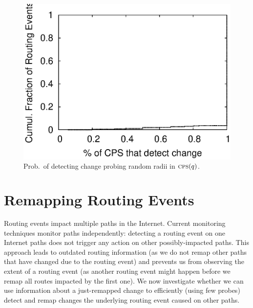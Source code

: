 \begin{figure}
\begin{minipage}{0.32\textwidth}
\label{fig:overlap.quantity.cdf}
\end{minipage}
%
\hfill
\begin{minipage}{0.32\textwidth}
\includegraphics[width=1.05\columnwidth]{figs/patching/overlapcoverage/overlapcoverage_only_lczd.eps}
\caption{Prob.~of detecting change probing random radii in $\mathrm{\textsc{cps}}(q)$.}
\label{fig:lczd.intersection}
\end{minipage}
\end{figure}

\section{Remapping Routing Events}
\label{sec:patching}

Routing events impact multiple paths in the Internet. Current
monitoring techniques monitor paths independently: detecting
a routing event on one Internet paths does not trigger any action on
other possibly-impacted paths.  This approach leads to outdated
routing information (as we do not remap other paths that have
changed due to the routing event) and prevents us from observing the
extent of a routing event (as another routing event might happen
before we remap all routes impacted by the first one).  We now
investigate whether we can use information about a just-remapped
change to efficiently (using few probes) detect and remap changes
the underlying routing event caused on other paths.


